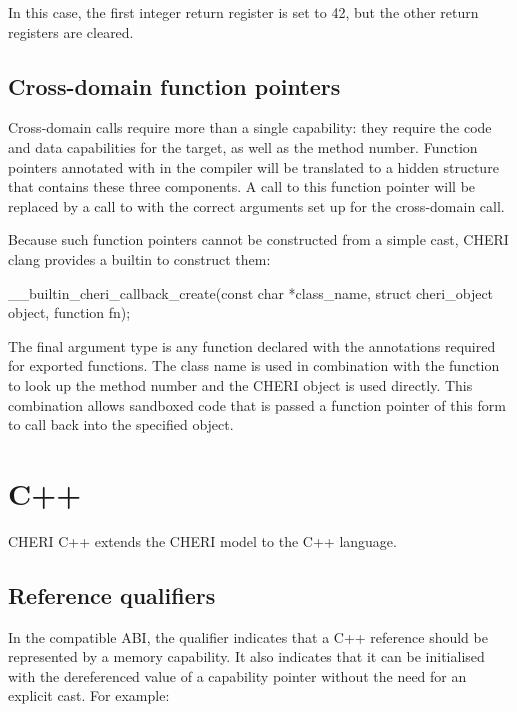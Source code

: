 
In this case, the first integer return register is set to 42, but the other return registers are cleared.  

\subsection{Cross-domain function pointers}

Cross-domain calls require more than a single capability: they require the code and data capabilities for the target, as well as the method number.
Function pointers annotated with  in the compiler will be translated to a hidden structure that contains these three components.
A call to this function pointer will be replaced by a call to  with the correct arguments set up for the cross-domain call.

Because such function pointers cannot be constructed from a simple cast, CHERI clang provides a builtin to construct them:
\begin{csnippet}
__builtin_cheri_callback_create(const char *class_name,
                                struct cheri_object object,
                                function fn);
\end{csnippet}

The final argument type is any function declared with the annotations required for exported functions.
The class name is used in combination with the function to look up the method number and the CHERI object is used directly.
This combination allows sandboxed code that is passed a function pointer of this form to call back into the specified object.

\section{C++}

CHERI C++ extends the CHERI model to the C++ language.

\subsection{Reference qualifiers}

In the compatible ABI, the  qualifier indicates that a C++ reference should be represented by a memory capability.
It also indicates that it can be initialised with the dereferenced value of a capability pointer without the need for an explicit cast. For example:

